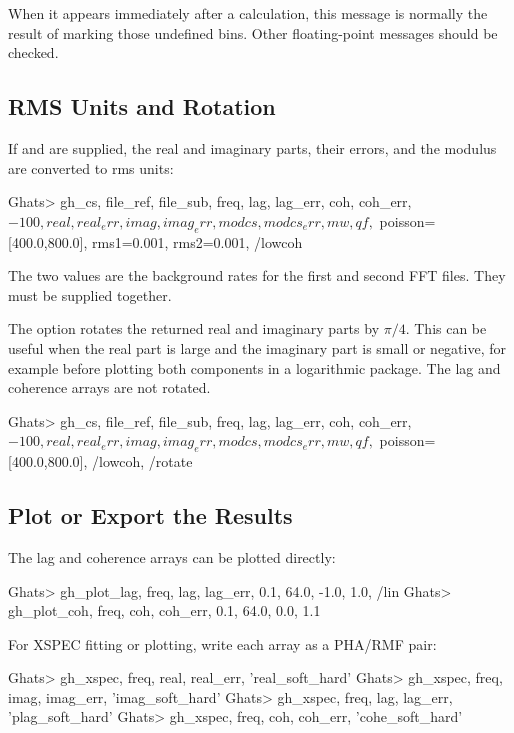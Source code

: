 When it appears immediately after a  calculation, this message
is normally the result of marking those undefined bins.  Other floating-point
messages should be checked.

\subsection*{RMS Units and Rotation}

If  and  are supplied, the real and imaginary parts,
their errors, and the modulus are converted to rms units:

\begin{ghatsconsole}
Ghats> gh_cs, file_ref, file_sub, freq, lag, lag_err, coh, coh_err, $
       -100, real, real_err, imag, imag_err, modcs, modcs_err, mw, qf, $
       poisson=[400.0,800.0], rms1=0.001, rms2=0.001, /lowcoh
\end{ghatsconsole}

The two values are the background rates for the first and second FFT files.
They must be supplied together.

The  option rotates the returned real and imaginary parts by
\(\pi/4\).  This can be useful when the real part is large and the imaginary
part is small or negative, for example before plotting both components in a
logarithmic package.  The lag and coherence arrays are not rotated.

\begin{ghatsconsole}
Ghats> gh_cs, file_ref, file_sub, freq, lag, lag_err, coh, coh_err, $
       -100, real, real_err, imag, imag_err, modcs, modcs_err, mw, qf, $
       poisson=[400.0,800.0], /lowcoh, /rotate
\end{ghatsconsole}

\subsection*{Plot or Export the Results}

The lag and coherence arrays can be plotted directly:

\begin{ghatsconsole}
Ghats> gh_plot_lag, freq, lag, lag_err, 0.1, 64.0, -1.0, 1.0, /lin
Ghats> gh_plot_coh, freq, coh, coh_err, 0.1, 64.0, 0.0, 1.1
\end{ghatsconsole}

For XSPEC fitting or plotting, write each array as a PHA/RMF pair:

\begin{ghatsconsole}
Ghats> gh_xspec, freq, real, real_err, 'real_soft_hard'
Ghats> gh_xspec, freq, imag, imag_err, 'imag_soft_hard'
Ghats> gh_xspec, freq, lag,  lag_err,  'plag_soft_hard'
Ghats> gh_xspec, freq, coh,  coh_err,  'cohe_soft_hard'
\end{ghatsconsole}

